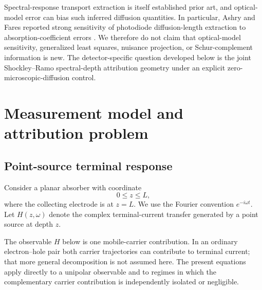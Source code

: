 \documentclass[aps,pra,twocolumn,superscriptaddress,nofootinbib]{revtex4-2}
\begin{document}
Spectral-response transport extraction is itself established prior art, and optical-model error can bias such inferred diffusion quantities. In particular, Ashry and Fares reported strong sensitivity of photodiode diffusion-length extraction to absorption-coefficient errors \cite{ashry2003diffusion}. We therefore do not claim that optical-model sensitivity, generalized least squares, nuisance projection, or Schur-complement information is new. The detector-specific question developed below is the joint Shockley--Ramo spectral-depth attribution geometry under an explicit zero-microscopic-diffusion control.


\section{Measurement model and attribution problem}
\label{sec:model}

\subsection{Point-source terminal response}

Consider a planar absorber with coordinate
\begin{equation}
0\le z\le L,
\end{equation}
where the collecting electrode is at $z=L$. We use the Fourier convention $e^{-i\omega t}$. Let $H(z,\omega)$ denote the complex terminal-current transfer generated by a point source at depth $z$.

The observable $H$ below is one mobile-carrier contribution. In an ordinary electron--hole pair both carrier trajectories can contribute to terminal current; that more general decomposition is not assumed here. The present equations apply directly to a unipolar observable and to regimes in which the complementary carrier contribution is independently isolated or negligible.
\end{document}
